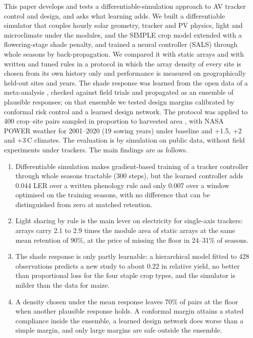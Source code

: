 This paper develops and tests a differentiable-simulation approach to AV tracker control and design, and asks what learning adds. We built a differentiable simulator that couples hourly solar geometry, tracker and PV physics, light and microclimate under the modules, and the SIMPLE crop model \citep{zhao2019} extended with a flowering-stage shade penalty, and trained a neural controller (SALS) through whole seasons by back-propagation. We compared it with static arrays and with written and tuned rules in a protocol in which the array density of every site is chosen from its own history only and performance is measured on geographically held-out sites and years. The shade response was learned from the open data of a meta-analysis \citep{laub2022}, checked against field trials \citep{gonocruz2021,weselek2021,ramosfuentes2023} and propagated as an ensemble of plausible responses; on that ensemble we tested design margins calibrated by conformal risk control and a learned design network. The protocol was applied to 400 crop--site pairs sampled in proportion to harvested area \citep{yu2020}, with NASA POWER weather for 2001--2020 (19 sowing years) \citep{sparks2018} under baseline and +1.5, +2 and +3\,\textdegree C climates. The evaluation is by simulation on public data, without field experiments under trackers. The main findings are as follows.
\begin{enumerate}
\item Differentiable simulation makes gradient-based training of a tracker controller through whole seasons tractable (300 steps), but the learned controller adds 0.044 LER over a written phenology rule and only 0.007 over a window optimised on the training seasons, with no difference that can be distinguished from zero at matched retention.
\item Light sharing by rule is the main lever on electricity for single-axis trackers: arrays carry 2.1 to 2.9 times the module area of static arrays at the same mean retention of 90\%, at the price of missing the floor in 24--31\% of seasons.
\item The shade response is only partly learnable: a hierarchical model fitted to 428 observations predicts a new study to about 0.22 in relative yield, no better than proportional loss for the four staple crop types, and the simulator is milder than the data for maize.
\item A density chosen under the mean response leaves 70\% of pairs at the floor when another plausible response holds. A conformal margin attains a stated compliance inside the ensemble, a learned design network does worse than a simple margin, and only large margins are safe outside the ensemble.
\end{enumerate}

